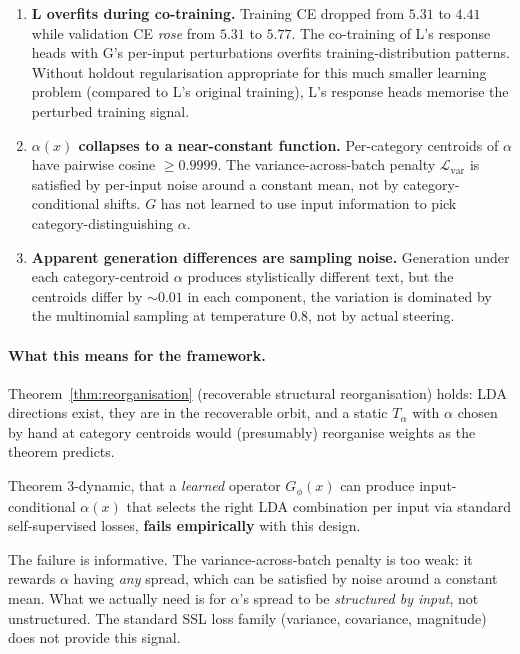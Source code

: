 \documentclass[11pt, a4paper]{article}
\theoremstyle{plain}
\theoremstyle{definition}
\theoremstyle{remark}
\begin{document}
\begin{enumerate}[nosep]
\item \textbf{L overfits during co-training.} Training CE dropped from $5.31$ to $4.41$ while validation CE \emph{rose} from $5.31$ to $5.77$. The co-training of L's response heads with G's per-input perturbations overfits training-distribution patterns. Without holdout regularisation appropriate for this much smaller learning problem (compared to L's original training), L's response heads memorise the perturbed training signal.
\item \textbf{$\alpha(x)$ collapses to a near-constant function.} Per-category centroids of $\alpha$ have pairwise cosine $\geq 0.9999$. The variance-across-batch penalty $\mathcal{L}_{\text{var}}$ is satisfied by per-input noise around a constant mean, not by category-conditional shifts. $G$ has not learned to use input information to pick category-distinguishing $\alpha$.
\item \textbf{Apparent generation differences are sampling noise.} Generation under each category-centroid $\alpha$ produces stylistically different text, but the centroids differ by $\sim 0.01$ in each component, the variation is dominated by the multinomial sampling at temperature $0.8$, not by actual steering.
\end{enumerate}

\paragraph{What this means for the framework.}

Theorem~\ref{thm:reorganisation} (recoverable structural reorganisation) holds: LDA directions exist, they are in the recoverable orbit, and a static $T_\alpha$ with $\alpha$ chosen by hand at category centroids would (presumably) reorganise weights as the theorem predicts.

Theorem 3-dynamic, that a \emph{learned} operator $G_\phi(x)$ can produce input-conditional $\alpha(x)$ that selects the right LDA combination per input via standard self-supervised losses, \textbf{fails empirically} with this design.

The failure is informative.
The variance-across-batch penalty is too weak: it rewards $\alpha$ having \emph{any} spread, which can be satisfied by noise around a constant mean.
What we actually need is for $\alpha$'s spread to be \emph{structured by input}, not unstructured.
The standard SSL loss family (variance, covariance, magnitude) does not provide this signal.
\end{document}
